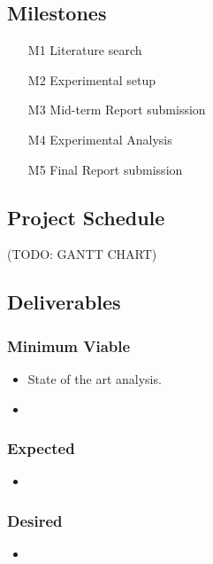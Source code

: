 \documentclass[rnd]{mas_proposal}
\begin{document}
\subsection{Milestones}
\begin{enumerate}
    \item[M1] Literature search
    \item[M2] Experimental setup
    \item[M3] Mid-term Report submission
    \item[M4] Experimental Analysis
    \item[M5] Final Report submission
\end{enumerate}

\subsection{Project Schedule}
    
(TODO: GANTT CHART)

\subsection{Deliverables}

\subsubsection*{Minimum Viable}
\begin{itemize}
    \item State of the art analysis.
    \item 
\end{itemize}

\subsubsection*{Expected}
\begin{itemize}
    \item 
\end{itemize}

\subsubsection*{Desired}
\begin{itemize}
    \item 
\end{itemize}


\nocite{*}

\end{document}
